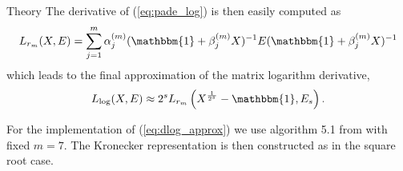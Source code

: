 \begin{chapter}{Theory}
The derivative of (\ref{eq:pade_log}) is then easily computed as 
\begin{equation}
    L_{r_m}(X,E) = \sum_{j=1}^m\alpha_j^{(m)}(\mathbbm{1}+\beta_j^{(m)}X)^{-1}E(\mathbbm{1}+\beta_j^{(m)}X)^{-1}
\end{equation}
which leads to the final approximation of the matrix logarithm derivative, 
\begin{equation}
    \label{eq:dlog_approx}
    L_{\log}(X,E)\approx 2^{s}L_{r_m}\left(X^{\frac{1}{2^s}}-\mathbbm{1},E_s \right).
\end{equation}

For the implementation of (\ref{eq:dlog_approx}) we use algorithm 5.1 from \cite{AlmohyFrechet} with fixed $m=7$.
The Kronecker representation is then constructed as in the square root case.








\end{chapter}
